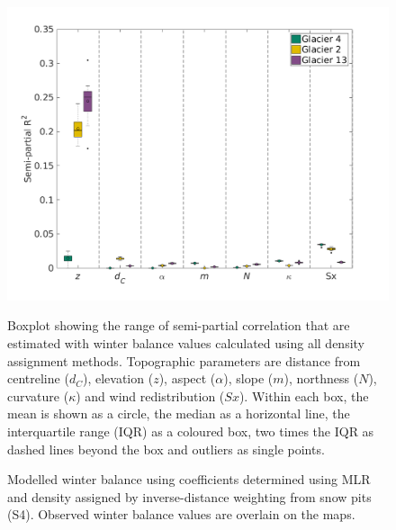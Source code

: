 \documentclass{sfuthesis}
\newcommand{\params}{Topographic parameters are distance from centreline ($d_C$), elevation ($z$), aspect ($\alpha$), slope ($m$), northness ($N$), curvature ($\kappa$) and wind redistribution ($Sx$). }
\newcommand{\boxplot}{Within each box, the mean is shown as a circle, the median as a horizontal line, the interquartile range (IQR) as a coloured box, two times the IQR as dashed lines beyond the box and outliers as single points. }
\newcommand{\swedots}{Observed winter balance values are overlain on the maps. }
\begin{document}
\begin{figure}
	\centering
	\includegraphics[width =1 \textwidth]{MLRsemiR2_DensityOpts.png}\\
	\caption{Boxplot showing the range of semi-partial correlation that are estimated with winter balance values calculated using all density assignment methods. \params \boxplot }
	\label{fig:MLRsemiR2_densityOptions}
\end{figure} 

\begin{figure}
	\caption{Modelled winter balance using coefficients determined using MLR and density assigned by inverse-distance weighting from snow pits (S4). \swedots}
	\label{fig:MLRmodelledSWE}
\end{figure}
\end{document}
